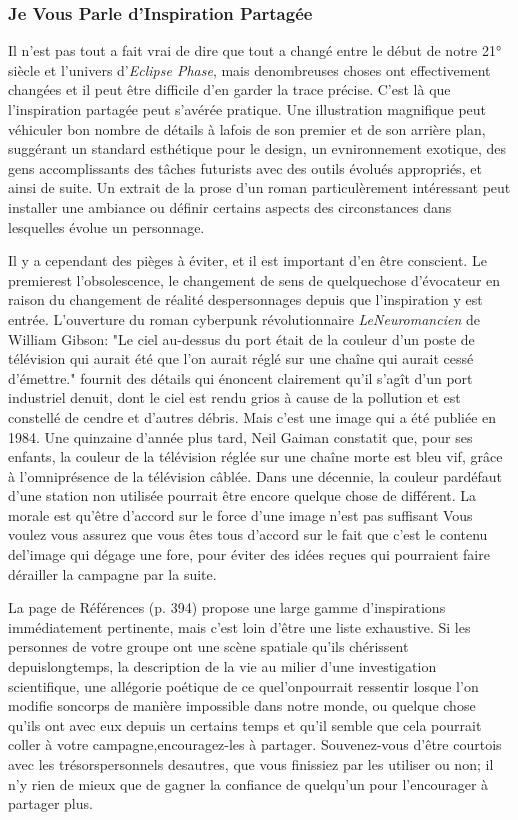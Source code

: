 \subsubsection{Je Vous Parle d'Inspiration Partagée} 

Il n'est pas tout a fait vrai de dire que tout a changé entre le début de notre 21° siècle et l'univers d'\textit{Eclipse Phase}, mais denombreuses choses ont effectivement changées et il peut être difficile d'en garder la trace précise. C'est là que l'inspiration partagée peut s'avérée pratique. Une illustration magnifique peut véhiculer bon nombre de détails à lafois de son premier et de son arrière plan, suggérant un standard esthétique pour le design, un evnironnement exotique, des gens accomplissants des tâches futurists avec des outils évolués appropriés, et ainsi de suite. Un extrait de la prose d'un roman particulèrement intéressant peut installer une ambiance ou définir certains aspects des circonstances dans lesquelles évolue un personnage. 

Il y a cependant des pièges à éviter, et il est important d'en être conscient. Le premierest l'obsolescence, le changement de sens de quelquechose d'évocateur en raison du changement de réalité despersonnages depuis que l'inspiration y est entrée. L'ouverture du roman cyberpunk révolutionnaire \textit{LeNeuromancien} de William Gibson: "Le ciel au-dessus du port était de la couleur d'un poste de télévision qui aurait été que l'on aurait réglé sur une chaîne qui aurait cessé d'émettre." fournit des détails qui énoncent clairement qu'il s'agît d'un port industriel denuit, dont le ciel est rendu grios à cause de la pollution et est constellé de cendre et d'autres débris. Mais c'est une image qui a été publiée en 1984. Une quinzaine d'année plus tard, Neil Gaiman constatit que, pour ses enfants, la couleur de la télévision réglée sur une chaîne morte est bleu vif, grâce à l'omniprésence de la télévision câblée. Dans une décennie, la couleur pardéfaut d'une station non utilisée pourrait être encore quelque chose de différent. La morale est qu'être d'accord sur le force d'une image n'est pas suffisant Vous voulez vous assurez que vous êtes tous d'accord sur le fait que c'est le contenu del'image qui dégage une fore, pour éviter des idées reçues qui pourraient faire dérailler la campagne par la suite. 

La page de Références (p. 394) propose une large gamme d'inspirations immédiatement pertinente, mais c'est loin d'être une liste exhaustive. Si les personnes de votre groupe ont une scène spatiale qu'ils chérissent depuislongtemps, la description de la vie au milier d'une investigation scientifique, une allégorie poétique de ce quel'onpourrait ressentir losque l'on modifie soncorps de manière impossible dans notre monde, ou quelque chose qu'ils ont avec eux depuis un certains temps et qu'il semble que cela pourrait coller à votre campagne,encouragez-les à partager. Souvenez-vous d'être courtois avec les trésorspersonnels desautres, que vous finissiez par les utiliser ou non; il n'y rien de mieux que de gagner la confiance de quelqu'un pour l'encourager à partager plus. 

